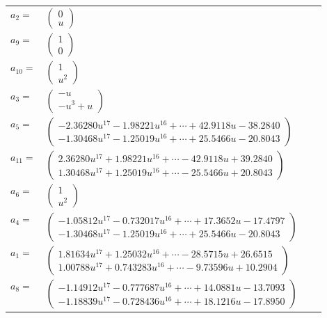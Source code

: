 \documentclass[1p]{elsarticle_modified}
\theoremstyle{definition}
\begin{document}
\begin{tabular}{m{7pt} m{180pt} m{7pt} m{180pt} }
\flushright $a_{2}=$&$\begin{pmatrix}0\\u\end{pmatrix}$ \\
\flushright $a_{9}=$&$\begin{pmatrix}1\\0\end{pmatrix}$ \\
\flushright $a_{10}=$&$\begin{pmatrix}1\\u^2\end{pmatrix}$ \\
\flushright $a_{3}=$&$\begin{pmatrix}- u\\- u^3+u\end{pmatrix}$ \\
\flushright $a_{5}=$&$\begin{pmatrix}-2.36280 u^{17}-1.98221 u^{16}+\cdots+42.9118 u-38.2840\\-1.30468 u^{17}-1.25019 u^{16}+\cdots+25.5466 u-20.8043\end{pmatrix}$ \\
\flushright $a_{11}=$&$\begin{pmatrix}2.36280 u^{17}+1.98221 u^{16}+\cdots-42.9118 u+39.2840\\1.30468 u^{17}+1.25019 u^{16}+\cdots-25.5466 u+20.8043\end{pmatrix}$ \\
\flushright $a_{6}=$&$\begin{pmatrix}1\\u^2\end{pmatrix}$ \\
\flushright $a_{4}=$&$\begin{pmatrix}-1.05812 u^{17}-0.732017 u^{16}+\cdots+17.3652 u-17.4797\\-1.30468 u^{17}-1.25019 u^{16}+\cdots+25.5466 u-20.8043\end{pmatrix}$ \\
\flushright $a_{1}=$&$\begin{pmatrix}1.81634 u^{17}+1.25032 u^{16}+\cdots-28.5715 u+26.6515\\1.00788 u^{17}+0.743283 u^{16}+\cdots-9.73596 u+10.2904\end{pmatrix}$ \\
\flushright $a_{8}=$&$\begin{pmatrix}-1.14912 u^{17}-0.777687 u^{16}+\cdots+14.0881 u-13.7093\\-1.18839 u^{17}-0.728436 u^{16}+\cdots+18.1216 u-17.8950\end{pmatrix}$ \\

\end{tabular}
\end{document}
